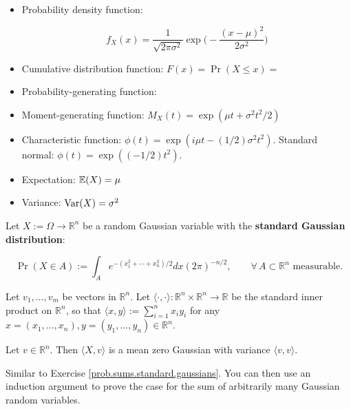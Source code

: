\begin{itemize}

\item Probability density function:

\[
f_X(x) = \frac{1}{\sqrt{2 \pi \sigma^2}} \exp \bigg( - \frac{(x-\mu)^2}{2 \sigma^2}\bigg)
\]

\item Cumulative distribution function: \(F(x) = \Pr(X \leq x) = \)

\item Probability-generating function:

\item Moment-generating function: \(M_X(t) = \exp (\mu t + \sigma^2 t^2/2) \)

\item Characteristic function: \(\phi(t) = \exp(i\mu t - (1/2) \sigma^2t^2)\). Standard normal: \(\phi(t) = \exp((-1/2)t^2)\).

\item Expectation: \(\mathbb{E}(X) = \mu\)

\item Variance: \(\mathrm{Var}(X) = \sigma^2 \)

\end{itemize}

\begin{theorem}\label{prob.thm.sums.gaussian} Let $X := \Omega\to\mathbb{R}^{n}$ be a random Gaussian variable with the \textbf{standard Gaussian distribution}:

$$\Pr(X\in A):=\int_{A}e^{-(x_{1}^{2}+\cdots+x_{n}^{2})/2}dx(2\pi)^{-n/2},\qquad\forall\, A\subset\mathbb{R}^{n}\,\,\mathrm{measurable}.$$

Let $v_1,\dots,v_m$ be vectors in $\mathbb{R}^{n}$.  Let $\langle\cdot, \cdot\rangle: \mathbb{R}^{n} \times \mathbb{R}^{n} \to\mathbb{R}$ be the standard inner product on $\mathbb{R}^{n}$, so that $\langle x,y\rangle:=\sum_{i=1}^{n}x_{i}y_{i}$ for any $x=(x_{1},\ldots,x_{n}),y=(y_{1},\ldots,y_{n})\in\mathbb{R}^{n}$.

Let $v\in\mathbb{R}^{n}$. Then $\langle X, v\rangle$ is a mean zero Gaussian with variance $\langle v,v\rangle$.


 \end{theorem}
 
 \begin{remark} Similar to Exercise \ref{prob.sums.standard.gaussians}. You can then use an induction argument to prove the case for the sum of arbitrarily many Gaussian random variables.
\end{remark}

